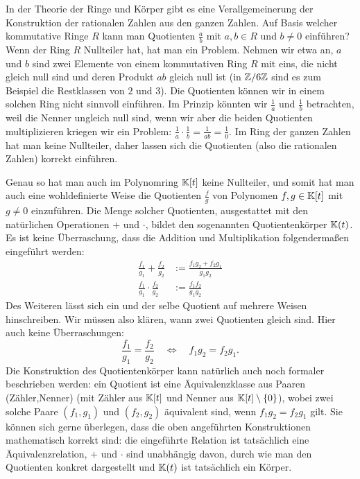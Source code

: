 In der Theorie der Ringe und Körper gibt es eine Verallgemeinerung der Konstruktion der rationalen Zahlen aus den ganzen Zahlen. Auf Basis welcher kommutative Ringe $R$ kann man Quotienten $\frac{a}{b}$ mit $a,b \in R$ und $b \ne 0$ einführen? Wenn der Ring $R$ Nullteiler hat, hat man ein Problem. Nehmen wir etwa an, $a$ und $b$ sind zwei Elemente von einem kommutativen Ring $R$ mit eins, die nicht gleich null sind und deren Produkt $a b$ gleich null ist (in $\mathbb Z / 6 \mathbb Z$ sind es zum Beispiel die Restklassen von $2$ und $3$). Die Quotienten können wir in einem solchen Ring nicht sinnvoll einführen. Im Prinzip könnten wir $\frac{1}{a}$ und $\frac{1}{b}$ betrachten, weil die Nenner ungleich null sind, wenn wir aber die beiden Quotienten multiplizieren  kriegen wir ein Problem: $\frac{1}{a} \cdot \frac{1}{b} = \frac{1}{a b} = \frac{1}{ 0}$. Im Ring der ganzen Zahlen hat man keine Nullteiler, daher lassen sich die Quotienten (also die rationalen Zahlen) korrekt einführen. 

Genau so hat man auch im Polynomring $\mathbb K[t]$ keine Nullteiler, und somit hat man auch eine wohldefinierte Weise die Quotienten $\frac{f}{g}$ von Polynomen $f, g \in \mathbb K[t]$ mit $g \ne 0$ einzuführen. Die Menge solcher Quotienten, ausgestattet mit den natürlichen Operationen $+$ und $\cdot$, bildet den sogenannten Quotientenkörper $\mathbb K(t)$. Es ist keine Überraschung, dass die Addition und Multiplikation folgendermaßen eingeführt werden: 
\begin{align}
\frac{f_1}{g_1} + \frac{f_2}{g_2} &:= \frac{f_1g_2 + f_2g_1}{g_1g_2} \\
\frac{f_1}{g_1} \cdot \frac{f_2}{g_2} &:= \frac{f_1f_2}{g_1g_2}
\end{align}
Des Weiteren lässt sich ein und der selbe Quotient auf mehrere Weisen hinschreiben. Wir müssen also klären, wann zwei Quotienten gleich sind. Hier auch keine Überraschungen: 
\begin{equation}
\frac{f_1}{g_1} = \frac{f_2}{g_2} \quad\Leftrightarrow\quad f_1g_2 = f_2g_1.
\end{equation}
Die Konstruktion des Quotientenkörper kann natürlich auch noch formaler beschrieben werden: ein Quotient ist eine Äquivalenzklasse aus Paaren (Zähler,Nenner) (mit Zähler aus $\mathbb K[t]$ und Nenner aus $\mathbb K[t] \setminus \{0\}$),  wobei zwei solche Paare $(f_1,g_1)$ und $(f_2, g_2)$ äquivalent sind, wenn $f_1 g_2 = f_2 g_1$ gilt. Sie können sich gerne überlegen, dass die oben angeführten Konstruktionen mathematisch korrekt sind: die eingeführte Relation ist tatsächlich eine Äquivalenzrelation, $+$ und $\cdot$ sind unabhängig davon, durch wie man den Quotienten konkret dargestellt und $\mathbb K(t)$ ist tatsächlich ein Körper. 

